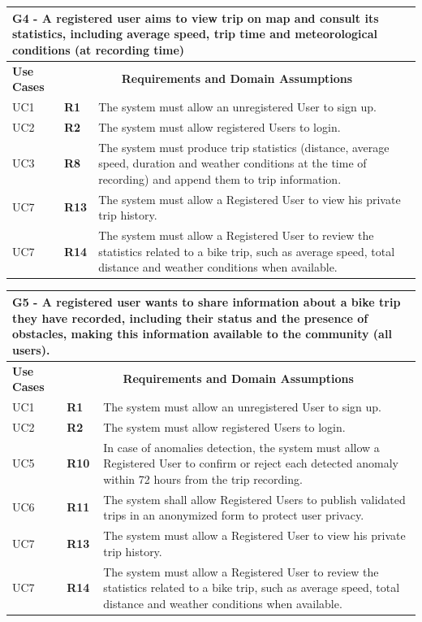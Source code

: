 \begin{longtable}{|p{2.5cm}|p{1cm}|p{10.5cm}|}
\hline
\multicolumn{3}{|p{14.5cm}|}{\centering \textbf{G4 - A registered user aims to view trip on map and consult its statistics, including average speed, trip time and meteorological conditions (at recording time)}} \\
\hline
\textbf{Use Cases} & \multicolumn{2}{c|}{\textbf{Requirements and Domain Assumptions}} \\
\hline
UC1 & \textbf{R1} & The system must allow an unregistered User to sign up. \\
\hline
UC2 & \textbf{R2} & The system must allow registered Users to login. \\
\hline
UC3 & \textbf{R8} & The system must produce trip statistics (distance, average speed, duration and weather conditions at the time of recording) and append them to trip information. \\
\hline
UC7 & \textbf{R13} & The system must allow a Registered User to view his private trip history. \\
\hline
UC7 & \textbf{R14} & The system must allow a Registered User to review the statistics related to a bike trip, such as average speed, total distance and weather conditions when available. \\
\hline
\end{longtable}

\newpage

\begin{longtable}{|p{2.5cm}|p{1cm}|p{10.5cm}|}
\hline
\multicolumn{3}{|p{14.5cm}|}{\centering \textbf{G5 - A registered user wants to share information about a bike trip they have recorded, including their status and the presence of obstacles, making this information available to the community (all users).}} \\
\hline
\textbf{Use Cases} & \multicolumn{2}{c|}{\textbf{Requirements and Domain Assumptions}} \\
\hline
UC1 & \textbf{R1} & The system must allow an unregistered User to sign up. \\
\hline
UC2 & \textbf{R2} & The system must allow registered Users to login. \\
\hline
UC5 & \textbf{R10} & In case of anomalies detection, the system must allow a Registered User to confirm or reject each detected anomaly within 72 hours from the trip recording. \\
\hline
UC6 & \textbf{R11} & The system shall allow Registered Users to publish validated trips in an anonymized form to protect user privacy. \\
\hline
UC7 & \textbf{R13} & The system must allow a Registered User to view his private trip history. \\
\hline
UC7 & \textbf{R14} & The system must allow a Registered User to review the statistics related to a bike trip, such as average speed, total distance and weather conditions when available. \\
\hline
\end{longtable}

